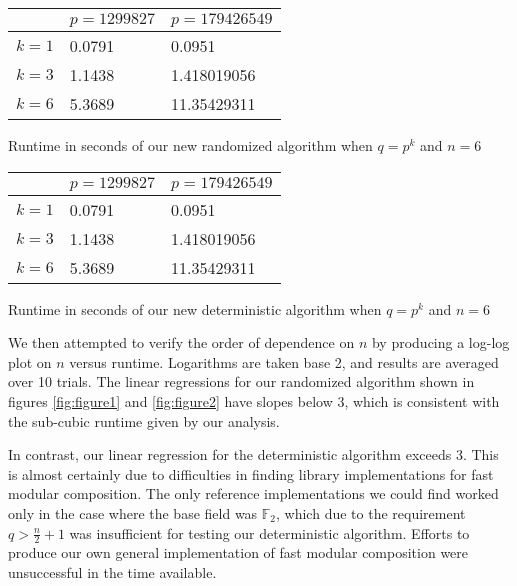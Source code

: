\documentclass{jams-l}
\theoremstyle{remark}
\numberwithin{equation}{section}
\begin{document}
\begin{center}
\begin{tabular}{ | m{2cm} | m{3cm}| m{3cm} | } 
\hline
 & $p = 1299827$ & $p = 179426549 $ \\ 
\hline
$k = 1$ & 0.0791 & 0.0951 \\ 
\hline
$k = 3$ & 1.1438 & 1.418019056\\
\hline 

$k = 6$ &5.3689 & 11.35429311\\

\hline
\end{tabular}
\end{center}
\begin{table}[h!]
  \centering
  \caption{Runtime in seconds of our new randomized algorithm when $q = p^k$ and $n = 6$}
  \label{tab:table1}
\end{table}


\begin{center}
\begin{tabular}{ | m{2cm} | m{3cm}| m{3cm} | } 
\hline
 & $p = 1299827$ & $p = 179426549 $ \\ 
\hline
$k = 1$ & 0.0791 & 0.0951 \\ 
\hline
$k = 3$ & 1.1438 & 1.418019056\\
\hline 

$k = 6$ &5.3689 & 11.35429311\\

\hline
\end{tabular}
\end{center}
\begin{table}[h!]
  \centering
  \caption{Runtime in seconds of our new deterministic algorithm when $q = p^k$ and $n = 6$}
  \label{tab:table2}
\end{table}


We then attempted to verify the order of dependence on $n$ by producing a log-log plot on $n$ versus runtime. Logarithms are taken base 2, and results are averaged over 10 trials. The linear regressions for our randomized algorithm shown in figures \ref{fig:figure1} and \ref{fig:figure2} have slopes below 3, which is consistent with the sub-cubic runtime given by our analysis.

In contrast, our linear regression for the deterministic algorithm exceeds 3. This is almost certainly due to difficulties in finding library implementations for fast modular composition. The only reference implementations we could find worked only in the case where the base field was $\mathbb{F}_2$, which due to the requirement $q > \frac{n}{2} + 1$ was insufficient for testing our deterministic algorithm. Efforts to produce our own general implementation of fast modular composition were unsuccessful in the time available.
\end{document}
